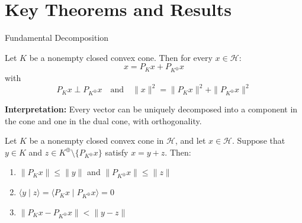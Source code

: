 \documentclass[aspectratio=169,10pt]{beamer}
\begin{document}
\section{Key Theorems and Results}

\begin{frame}{Fundamental Decomposition}
\begin{theorem}
Let $K$ be a nonempty closed convex cone. Then for every $x \in \mathcal{H}$:
\[
x = P_K x + P_{K^{\oplus}} x
\]
with
\[
P_K x \perp P_{K^{\oplus}} x \quad \text{and} \quad \|x\|^2 = \|P_K x\|^2 + \|P_{K^{\oplus}} x\|^2
\]
\end{theorem}

\vspace{0.3cm}

\textbf{Interpretation:} Every vector can be uniquely decomposed into a component in the cone and one in the dual cone, with orthogonality.

\vspace{0.3cm}

\begin{corollary}[6.31]
Let $K$ be a nonempty closed convex cone in $\mathcal{H}$, and let $x \in \mathcal{H}$.
Suppose that $y \in K$ and $z \in K^{\oplus} \setminus \{P_{K^{\oplus}} x\}$ satisfy $x = y + z$. Then:
\begin{enumerate}
    \item $\|P_K x\| \leq \|y\|$ and $\|P_{K^{\oplus}} x\| \leq \|z\|$
    \item $\langle y \mid z \rangle = \langle P_K x \mid P_{K^{\oplus}} x \rangle = 0$
    \item $\|P_K x - P_{K^{\oplus}} x\| < \|y - z\|$
\end{enumerate}
\end{corollary}
\end{frame}
\end{document}
